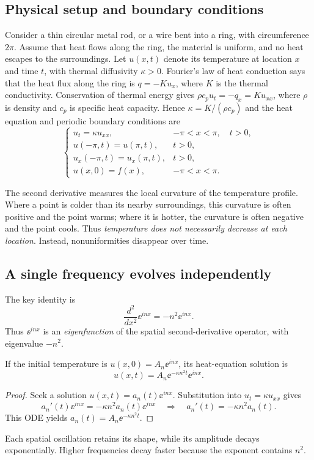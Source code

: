 \subsection{Physical setup and boundary conditions}
Consider a thin circular metal rod, or a wire bent into a ring, with
circumference $2\pi$. Assume that heat flows along the ring, the material is
uniform, and no heat escapes to the surroundings. Let $u(x,t)$ denote its
temperature at location $x$ and time $t$, with thermal diffusivity $\kappa>0$.
Fourier's law of heat conduction says that the heat flux along the ring is
$q=-K u_x$, where $K$ is the thermal conductivity. Conservation of thermal
energy gives $\rho c_p u_t=-q_x=K u_{xx}$, where $\rho$ is density and
$c_p$ is specific heat capacity. Hence $\kappa=K/(\rho c_p)$ and the
heat equation and periodic boundary conditions are
\begin{equation}\label{eq:heat-pde}
 \begin{cases}
 u_t=\kappa u_{xx}, &-\pi<x<\pi,\quad t>0,\\
 u(-\pi,t)=u(\pi,t),&t>0,\\
 u_x(-\pi,t)=u_x(\pi,t),&t>0,\\
 u(x,0)=f(x),&-\pi<x<\pi.
 \end{cases}
\end{equation}

The second derivative measures the local curvature of the temperature profile.
Where a point is colder than its nearby surroundings, this curvature is often
positive and the point warms; where it is hotter, the curvature is often
negative and the point cools. Thus \emph{temperature does not necessarily
decrease at each location}. Instead, nonuniformities disappear over time.

\subsection{A single frequency evolves independently}
The key identity is
\begin{equation}\label{eq:eigen}
 \frac{d^2}{dx^2}\ee^{inx}=-n^2\ee^{inx}.
\end{equation}
Thus $\ee^{inx}$ is an \emph{eigenfunction} of the spatial second-derivative
operator, with eigenvalue $-n^2$.

\begin{proposition}\label{prop:mode}
If the initial temperature is $u(x,0)=A_n\ee^{inx}$, its heat-equation
solution is
\begin{equation}\label{eq:mode-solution}
 \boxed{u(x,t)=A_n\ee^{-\kappa n^2t}\ee^{inx}.}
\end{equation}
\end{proposition}
\begin{proof}
Seek a solution $u(x,t)=a_n(t)\ee^{inx}$. Substitution into
$u_t=\kappa u_{xx}$ gives
\[
 a_n'(t)\ee^{inx}=-\kappa n^2a_n(t)\ee^{inx}
 \quad\Longrightarrow\quad a_n'(t)=-\kappa n^2a_n(t).
\]
This ODE yields $a_n(t)=A_n\ee^{-\kappa n^2t}$.
\end{proof}
Each spatial oscillation retains its shape, while its amplitude decays
exponentially. Higher frequencies decay faster because the exponent contains $n^2$.

